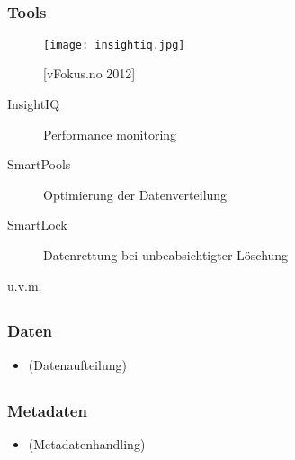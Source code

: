 \documentclass{beamer}
\begin{document}
\subsection{}
\begin{frame}[fragile]
  \frametitle{Tools}

  \vspace{-3mm}

  \begin{figure}[htp]
    \centering
    \texttt{[image: insightiq.jpg]}
    \caption{[vFokus.no 2012]}
  \end{figure}
  
  \vspace{-5mm}

  \begin{description}
    \item[InsightIQ] Performance monitoring
    \item[SmartPools] Optimierung der Datenverteilung
    \item[SmartLock] Datenrettung bei unbeabsichtigter Löschung 
    \item[u.v.m.] 
  \end{description}

\end{frame}    

\subsection{}
\begin{frame}[fragile]
  \frametitle{Daten}

  \begin{itemize}
    \item (Datenaufteilung)
  \end{itemize}

\end{frame}    

\subsection{}
\begin{frame}[fragile]
  \frametitle{Metadaten}

  \begin{itemize}
    \item (Metadatenhandling)
  \end{itemize}

\end{frame}      
\end{document}
